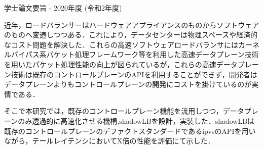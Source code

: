 学士論文要旨 - 2020年度 (令和2年度)
\begin{center}
\begin{large}
\end{large}
\end{center}

近年，ロードバランサーはハードウェアアプライアンスのものからソフトウェアのものへ変遷しつつある．これにより，データセンターは物理スペースや経済的なコスト問題を解決した．これらの高速ソフトウェアロードバランサにはカーネルバイパス系パケット処理フレームワーク等を利用した高速データプレーン技術を用いたパケット処理性能の向上が図られているが，これらの高速データプレーン技術は既存のコントロールプレーンのAPIを利用することができず，開発者はデータプレーンよりもコントロールプレーンの開発にコストを掛けているのが実情である．

そこで本研究では，既存のコントロールプレーン機能を流用しつつ，データプレーンのみ透過的に高速化させる機構,shadowLBを設計，実装した．shadowLBは既存のコントロールプレーンのデファクトスタンダードであるipvsのAPIを用いながら，テールレイテンシにおいてX倍の性能を評価にて示した．









